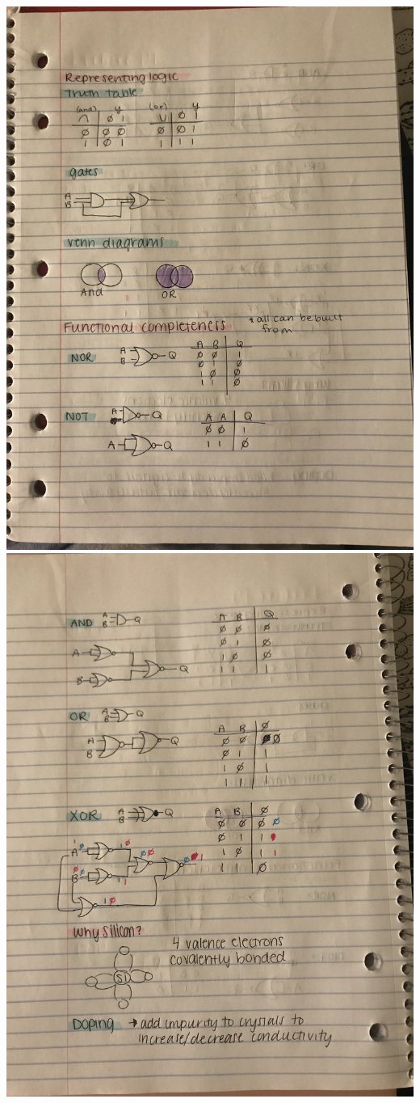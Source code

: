 \documentclass[11pt]{book}
\begin{document}
\\
\includegraphics[width=\textwidth]{figures/notes3.jpg}
\\
\includegraphics[width=\textwidth]{figures/notes4.jpg}
\end{document}
